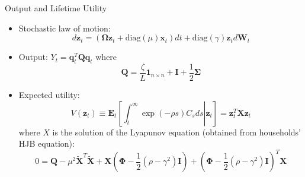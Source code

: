 \documentclass[
  10pt,               %
  aspectratio=169,     %
]{beamer}
\theoremstyle{plain}
\begin{document}
\begin{frame}{Output and Lifetime Utility }

  \label{X}
  \begin{itemize}
    \item  Stochastic law of motion:
          \[d\bm{z}_{t}=\left(\bm{\Omega}\bm{z}_{t}+\mathrm{diag}\left(\mu\right)\bm{x}_{t}\right)dt+\mathrm{diag}\left(\gamma\right)\bm{z}_{t} d\bm{W}_{t}\]
    \item Output: $Y_{t}=\bm{q}_{t}^{T}\bm{Q}\bm{q}_{t}$ where
          \[
            \bm{Q}=\frac{\zeta}{L}\bm{1}_{n\times n}+\bm{I}+\frac{1}{2}\bm{\Sigma}
          \]
    \item Expected utility:
          \[
            V\left(\bm{z}_{t}\right)\equiv\bm{E}_{t}\left[\left.\int_{t}^{\infty}\exp\left(-\rho s\right)C_{s}ds\right|\bm{z}_{t}\right]=\bm{z}_{t}^{T}\bm{X}\bm{z}_{t}
          \]
          where $X$ is the solution of the Lyapunov equation (obtained from
          households' HJB equation):
          \[
            0=\bm{Q}-\mu^{2}\bm{\tilde{X}}^{T}\bm{\tilde{X}}+\bm{X}\left(\bm{\Phi}-\frac{1}{2}\left(\rho-\gamma^{2}\right)\bm{I}\right)+\left(\bm{\Phi}-\frac{1}{2}\left(\rho-\gamma^{2}\right)\bm{I}\right)^{T}\bm{X}
          \]
  \end{itemize}
  \hyperlink{aggregation}{}
\end{frame}
\end{document}
